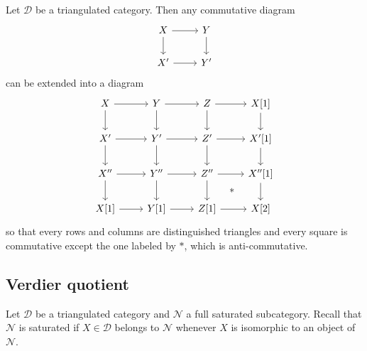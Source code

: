 \begin{proposition}
Let $\mathcal{D}$ be a triangulated category. Then any commutative diagram
\[\begin{tikzcd}
X\ar[d]\ar[r]&Y\ar[d]\\
X'\ar[r]&Y'
\end{tikzcd}\]
can be extended into a diagram
\[\begin{tikzcd}
X\ar[d]\ar[r]&Y\ar[d]\ar[r]&Z\ar[r]\ar[d]&X[1]\ar[d]\\
X'\ar[r]\ar[d]&Y'\ar[r]\ar[d]&Z'\ar[r]\ar[d]&X'[1]\ar[d]\\
X''\ar[r]\ar[d]&Y''\ar[r]\ar[d]&Z''\ar[r]\ar[rd,phantom,"\ast"]\ar[d]&X''[1]\ar[d]\\
X[1]\ar[r]&Y[1]\ar[r]&Z[1]\ar[r]&X[2]
\end{tikzcd}\]
so that every rows and columns are distinguished triangles and every square is commutative except the one labeled by $\ast$, which is anti-commutative.
\end{proposition}
\subsection{Verdier quotient}
Let $\mathcal{D}$ be a triangulated category and $\mathcal{N}$ a full saturated subcategory. Recall that $\mathcal{N}$ is saturated if $X\in\mathcal{D}$ belongs to $\mathcal{N}$ whenever $X$ is isomorphic to an object of $\mathcal{N}$.

